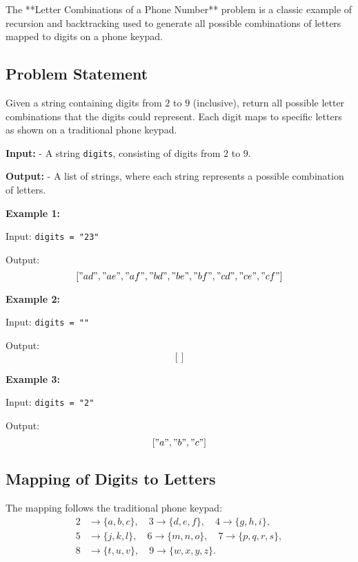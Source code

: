 
\label{problem:Letter_Combinations_of_a_Phone_Number}

The **Letter Combinations of a Phone Number** problem is a classic example of recursion and backtracking used to generate all possible combinations of letters mapped to digits on a phone keypad.

\subsection*{Problem Statement}
Given a string containing digits from \(2\) to \(9\) (inclusive), return all possible letter combinations that the digits could represent. Each digit maps to specific letters as shown on a traditional phone keypad.

\textbf{Input:}
- A string \texttt{digits}, consisting of digits from \(2\) to \(9\).

\textbf{Output:}
- A list of strings, where each string represents a possible combination of letters.

\textbf{Example 1:}

Input: \texttt{digits = "23"}

Output: \[
["ad", "ae", "af", "bd", "be", "bf", "cd", "ce", "cf"]
\]

\textbf{Example 2:}

Input: \texttt{digits = ""}

Output: \[
[]
\]

\textbf{Example 3:}

Input: \texttt{digits = "2"}

Output: \[
["a", "b", "c"]
\]

\subsection*{Mapping of Digits to Letters}
The mapping follows the traditional phone keypad:
\[
\begin{aligned}
2 &\rightarrow \{a, b, c\}, \quad
3 \rightarrow \{d, e, f\}, \quad
4 \rightarrow \{g, h, i\}, \\
5 &\rightarrow \{j, k, l\}, \quad
6 \rightarrow \{m, n, o\}, \quad
7 \rightarrow \{p, q, r, s\}, \\
8 &\rightarrow \{t, u, v\}, \quad
9 \rightarrow \{w, x, y, z\}.
\end{aligned}
\]

